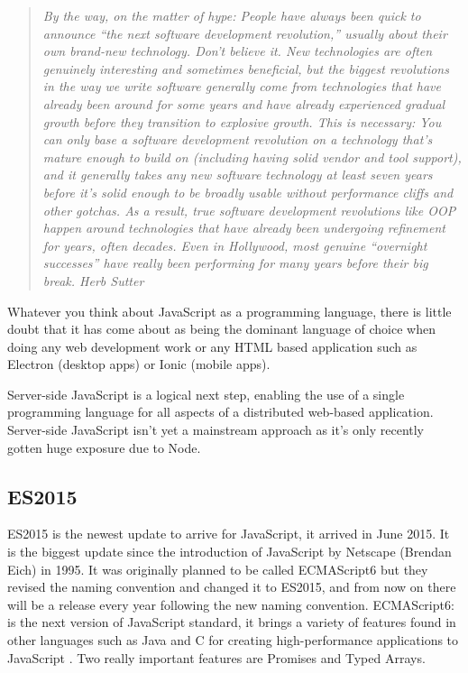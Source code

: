 \documentclass[12pt]{article} %
\begin{document}
\begin{quote}
\itshape By the way, on the matter of hype: People have always been quick to announce ``the next software development revolution,'' usually about their own brand-new technology. Don't believe it. New technologies are often genuinely interesting and sometimes beneficial, but the biggest revolutions in the way we write software generally come from technologies that have already been around for some years and have already experienced gradual growth before they transition to explosive growth. This is necessary: You can only base a software development revolution on a technology that's mature enough to build on (including having solid vendor and tool support), and it generally takes any new software technology at least seven years before it's solid enough to be broadly usable without performance cliffs and other gotchas. As a result, true software development revolutions like OOP happen around technologies that have already been undergoing refinement for years, often decades. Even in Hollywood, most genuine ``overnight successes'' have really been performing for many years before their big break.
\hfill Herb Sutter \cite{11}
\end{quote}

Whatever you think about JavaScript as a programming language, there is little doubt that it has come about as being the dominant language of choice when doing any web development work or any HTML based application such as Electron (desktop apps) or Ionic (mobile apps).

Server-side JavaScript is a logical next step, enabling the use of a single programming language for all aspects of a distributed web-based application.
Server-side JavaScript isn't yet a mainstream approach as it's only recently gotten huge exposure due to Node.

\subsection{ES2015} %
ES2015 is the newest update to arrive for JavaScript, it arrived in June 2015. It is the biggest update since the introduction of JavaScript by Netscape (Brendan Eich) in 1995.
It was originally planned to be called ECMAScript6 but they revised the naming convention and changed it to ES2015, and from now on there will be a release every year following the new naming convention.
ECMAScript6: is the next version of JavaScript standard, it brings a variety of features found in other languages such as Java and C for creating high-performance applications to JavaScript \cite{2}. Two really important features are Promises and Typed Arrays.
\end{document}
